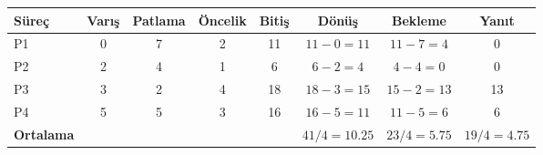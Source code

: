 \begin{tabular}{@{}lccccccc@{}}
\toprule
\textbf{Süreç} & \textbf{Varış} & \textbf{Patlama} & \textbf{Öncelik} & \textbf{Bitiş} & \textbf{Dönüş} & \textbf{Bekleme} & \textbf{Yanıt}\\
\midrule
P1 & 0 & 7 & 2 & 11 & $11-0=11$ & $11-7=4$ & 0\\
P2 & 2 & 4 & 1 & 6 & $6-2=4$ & $4-4=0$ & 0\\
P3 & 3 & 2 & 4 & 18 & $18-3=15$ & $15-2=13$ & 13\\
P4 & 5 & 5 & 3 & 16 & $16-5=11$ & $11-5=6$ & 6\\
\midrule
\textbf{Ortalama} &  &  &  &  & $41/4=10.25$ & $23/4=5.75$ & $19/4=4.75$\\
\bottomrule
\end{tabular}
